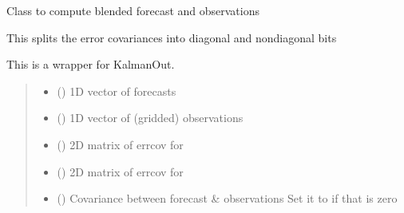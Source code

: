\documentclass[letterpaper,10pt,english]{sphinxmanual}
\begin{document}
\begin{fulllineitems}
\label{\detokenize{kalman:glomar_gridding.autoregressive_kalman.KalmanOutUncorrCorrSplit}}
\pysigstartsignatures
\pysiglinewithargsret
{}
{\sphinxparamcomma {}\sphinxparamcomma {}\sphinxparamcomma {}\sphinxparamcomma {}\sphinxparamcomma {}\sphinxparamcomma {}}
{}
\pysigstopsignatures
\sphinxAtStartPar
Class to compute blended forecast and observations

\sphinxAtStartPar
This splits the error covariances into diagonal and non\sphinxhyphen{}diagonal bits

\sphinxAtStartPar
This is a wrapper for KalmanOut.
\begin{quote}\begin{description}
\begin{itemize}
\item {}
\sphinxAtStartPar
{} () \textendash{} 1D vector of forecasts

\item {}
\sphinxAtStartPar
{} () \textendash{} 1D vector of (gridded) observations

\item {}
\sphinxAtStartPar
{} () \textendash{} 2D matrix of errcov for 

\item {}
\sphinxAtStartPar
{} () \textendash{} 2D matrix of errcov for 

\item {}
\sphinxAtStartPar
{} () \textendash{} Covariance between forecast \& observations
Set it to  if that is zero


\end{itemize}
\end{description}
\end{quote}
\end{fulllineitems}
\end{document}
